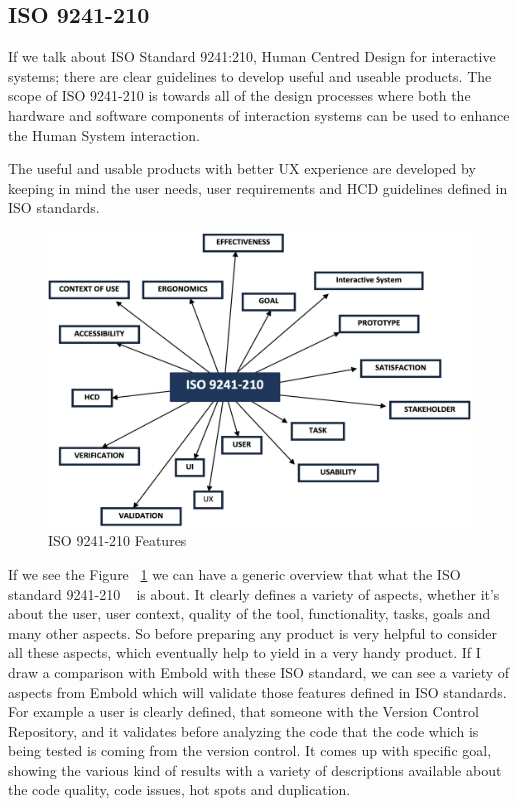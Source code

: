 \subsection{ISO 9241-210}
If we talk about ISO Standard 9241:210, Human Centred Design for interactive systems; there are clear guidelines to develop useful and useable products. The scope of ISO 9241-210 is towards all of the design processes where both the hardware and software components of interaction systems can be used to enhance the Human System interaction.\par
The useful and usable products with better UX experience are developed by keeping in mind the user needs, user requirements and  HCD guidelines defined in ISO standards.
\begin{figure}[htbp]
\begin{center}
\includegraphics[width=4 in, height=3 in]{ISO.png}
\caption{ISO 9241-210 Features ~\cite{features}}
\label{fig:ISO}
\end{center}
\end{figure}
If we see the Figure ~\ref{fig:ISO} we can have a generic overview that what the ISO standard 9241-210 ~\cite{ISO} is about. It clearly defines a variety of aspects, whether it's about the user, user context, quality of the tool, functionality, tasks, goals and many other aspects. So before preparing any product is very helpful to consider all these aspects, which eventually help to yield in a very handy product. If I draw a comparison with Embold with these ISO standard, we can see a variety of aspects from Embold which will validate those features defined in ISO standards. For example a user is clearly defined, that someone with the Version Control Repository, and it validates before analyzing the code that the code which is being tested is coming from the version control. 
It comes up with specific goal, showing the various kind of results with a variety of descriptions available about the code quality, code issues, hot spots and duplication.  \par
